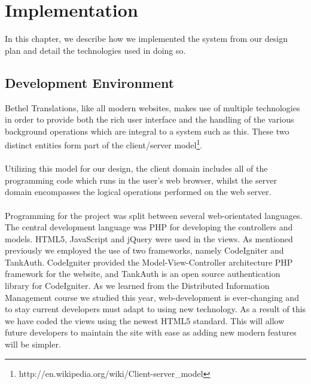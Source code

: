 \documentclass{l3proj}
\begin{document}
\chapter{Implementation}
\label{chap:impl}

In this chapter, we describe how we implemented the system from our design plan
and detail the technologies used in doing so.


\section{Development Environment}
\label{sect:dev-env}
Bethel Translations, like all modern websites, makes use of multiple
technologies in order to provide both the rich user interface and the handling
of the various background operations which are integral to a system such as this.
These two distinct entities form part of the client/server
model\footnote{http://en.wikipedia.org/wiki/Client-server\_model}.\\
\\
Utilizing this model for our design, the client domain includes all of the programming code which runs in the
user's web browser, whilst the server domain encompasses the logical operations
performed on the web server.\\
\\
Programming for the project was split between several web-orientated languages.
The central development language was PHP for developing the controllers and
models. HTML5, JavaScript and jQuery were used in the views. As mentioned
previously we employed the use of two frameworks, namely CodeIgniter and
TankAuth. CodeIgniter provided the Model-View-Controller architecture PHP
framework for the website, and TankAuth is an open source authentication library
for CodeIgniter.\newline
\newline
As we learned from the Distributed Information Management course we studied this
year, web-development is ever-changing and to stay current developers must adapt
to using new technology. As a result of this we have coded the views using the
newest HTML5 standard. This will allow future developers to maintain the site
with ease as adding new modern features will be simpler.\newline
\newline
\end{document}
